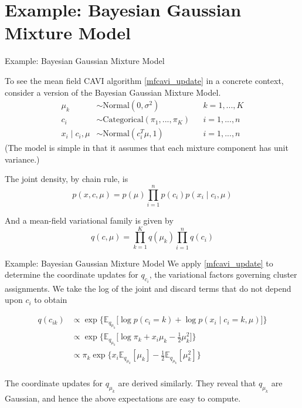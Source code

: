 \documentclass[10pt]{beamer}
\numberwithin{equation}{section}
\theoremstyle{definition}
\newcommand{\ds}{\displaystyle}
\newcommand{\df}{\displaystyle\frac}
\newcommand{\+}[1]{\ensuremath{{\boldsymbol #1}}} %
\newcommand{\cond}{\; | \;}
\newcommand{\E}{\mathbb{E}}
\begin{document}
\section{Example: Bayesian Gaussian Mixture Model}
\begin{frame}{Example: Bayesian Gaussian Mixture Model}

To see the mean field CAVI algorithm \eqref{mfcavi_update} in a concrete context, consider a version of the Bayesian Gaussian Mixture Model.  
\begin{align*}
\mu_k & \sim \text{Normal}(0, \sigma^2) && k = 1,..., K\\
c_i & \sim \text{Categorical}(\pi_1, ..., \pi_K) && i=1, ... ,n \\
x_i \cond c_i, \mu & \sim \text{Normal}(c_i^T \mu, 1) && i = 1,..., n
\end{align*}
\tiny (The model is simple in that it assumes that each mixture component has unit variance.) \normalsize 

The joint density, by chain rule, is
\[ p(x,c,\mu) = p(\mu) \ds\prod_{i=1}^n p(c_i) p(x_i \cond c_i, \mu) \]

And a mean-field variational family is given by 
\[  q(c, \mu) = \ds\prod_{k=1}^K q(\mu_k) \ds\prod_{i=1}^n q(c_i) \]

\end{frame}

\begin{frame}{Example: Bayesian Gaussian Mixture Model}
We apply \eqref{mfcavi_update} to determine the coordinate updates for $q_{c_i}$, the variational factors governing cluster assignments.   We take the log of the joint and discard terms that do not depend upon $c_i$ to obtain

\begin{align*}
q(c_{ik}) & \propto \exp \bigg\{ \E_{q_{\mu_k}} \bigg[  \log p(c_i =k) + \log p(x_i \cond c_i=k, \mu) \bigg] \bigg\} \\
& \propto \exp \bigg\{ \E_{q_{\mu_k}} \bigg[ \log \pi_k + x_i \mu_k - \df{1}{2} \mu_k^2 \bigg] \bigg\} \\
& \propto \pi_k \exp \bigg\{ x_i \E_{q_{\mu_k}} [\mu_k] - \df{1}{2}  \E_{q_{\mu_k}} [ \mu_k^2] \bigg\} \\
\end{align*}

The coordinate updates for $q_{\mu_k}$ are derived similarly.  They reveal that $q_{\mu_k}$ are Gaussian, and hence the above expectations are easy to compute. 

\end{frame}
\end{document}
